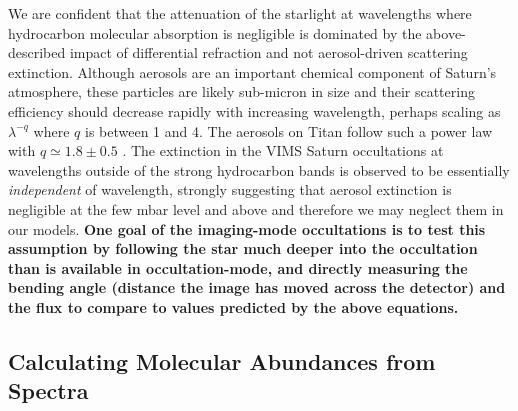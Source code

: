 \documentclass[12pt]{article}
\begin{document}
We are confident that the attenuation of the starlight at wavelengths where
hydrocarbon molecular absorption is negligible is dominated by the
above-described impact of differential refraction and not aerosol-driven
scattering extinction. Although aerosols are an important chemical component of
Saturn's atmosphere, these particles are likely sub-micron in size and their
scattering efficiency should decrease rapidly with increasing wavelength,
perhaps scaling as $\lambda^{-q}$ where $q$ is between 1 and 4. The aerosols on
Titan follow such a power law with $q\simeq1.8\pm0.5$ \citep{Bellucci09}. The
extinction in the VIMS Saturn occultations at wavelengths outside of the strong
hydrocarbon bands is observed to be essentially {\sl independent} of
wavelength, strongly suggesting that aerosol extinction is negligible at the
few mbar level and above and therefore we may neglect them in our models. {\bf
One goal of the imaging-mode occultations is to test this assumption by
following the star much deeper into the occultation than is available in
occultation-mode, and directly measuring the bending angle (distance the image
has moved across the detector) and the flux to compare to values predicted by
the above equations.}

\subsection{Calculating Molecular Abundances from Spectra}
\end{document}
